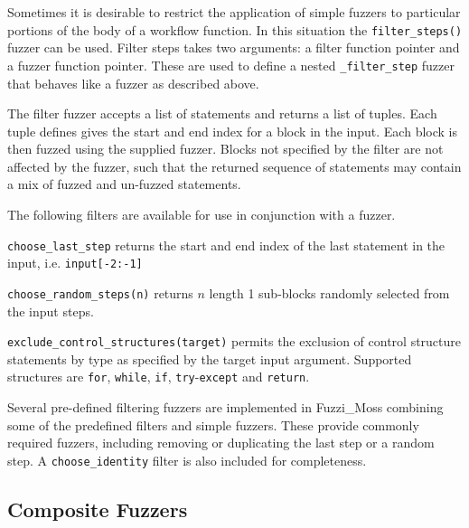 \documentclass{sig-alternate}
\newenvironment{FunctionList}{%
\lstset{basicstyle=\ttfamily\bfseries\small}
\begin{list}{}{\leftmargin=5pt}
}{\end{list}\lstset{basicstyle=\ttfamily\small}}
\begin{document}

Sometimes it is desirable to restrict the application of simple fuzzers to
particular portions of the body of a workflow function.  In this situation the
\lstinline!filter_steps()! fuzzer can be used.  Filter steps takes two
arguments: a filter function pointer and a fuzzer function pointer.  These are
used to define a nested \lstinline!_filter_step! fuzzer that behaves like a
fuzzer as described above.

The filter fuzzer accepts a list of statements and returns a list of tuples.
Each tuple defines gives the start and end index for a block in the input.  Each
block is then fuzzed using the supplied fuzzer.  Blocks not specified by the
filter are not affected by the fuzzer, such that the returned sequence of
statements may contain a mix of fuzzed and un-fuzzed statements.

The following filters are available for use in conjunction with a fuzzer.


\begin{FunctionList}

\item \lstinline!choose_last_step! returns the start and end index of the last
  statement in the input, i.e. \lstinline!input[-2:-1]!

\item \lstinline!choose_random_steps(n)!  returns $n$ length 1 sub-blocks
  randomly selected from the input steps.

\item \lstinline!exclude_control_structures(target)! permits the exclusion of
  control structure statements by type as specified by the target input
  argument. Supported structures are \lstinline!for!, \lstinline!while!,
  \lstinline!if!, \lstinline!try!-\lstinline!except! and \lstinline!return!.

\end{FunctionList}

Several pre-defined filtering fuzzers are implemented in Fuzzi\_Moss combining
some of the predefined filters and simple fuzzers.  These provide commonly
required fuzzers, including removing or duplicating the last step or a random
step. A \lstinline!choose_identity! filter is also included for completeness.


\subsection{Composite Fuzzers}
\end{document}
